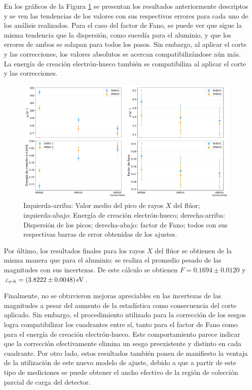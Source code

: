 En los gráficos de la Figura \ref{fig:F_mu_sigma_fano_eh} se presentan los resultados anteriormente descriptos y se ven las tendencias de los valores con sus respectivos errores para cada uno de los análisis realizados. Para el caso del factor de Fano, se puede ver que sigue la misma tendencia que la dispersión, como sucedía para el aluminio, y que los errores de ambos se solapan para todos los pasos. Sin embargo, al aplicar el corte y las correcciones, los valores absolutos se acercan compatibilizándose aún más. La energía de creación electrón-hueco también se compatibiliza al aplicar el corte y las correcciones.
\begin{figure}[h]
    \centering
        \includegraphics[scale=0.45]{Figs/F_mu_sigma_fano_Eeh.pdf}
    \caption{Izquierda-arriba: Valor medio del pico de rayos $X$ del flúor; izquierda-abajo: Energía de creación electrón-hueco; derecha-arriba: Dispersión de los picos; derecha-abajo: factor de Fano; todos con sus respectivas barras de error obtenidas de los ajustes.}
    \label{fig:F_mu_sigma_fano_eh}
\end{figure}

Por último, los resultados finales para los rayos $X$ del flúor se obtienen de la misma manera que para el aluminio:  se realiza el promedio pesado de las magnitudes con sus incertezas. De este cálculo se obtienen $F = 0.1694 \pm 0.0120 $ y $\varepsilon_{\eh} =(3.8222 \pm 0.0048)\,\si{eV}$.

Finalmente, no se obtuvieron mejoras apreciables en las incertezas de las magnitudes a pesar del aumento de la estadística como consecuencia del corte aplicado. Sin embargo, el procedimiento utilizado para la corrección de los sesgos logra compatibilizar los cuadrantes entre sí, tanto para el factor de Fano como para el energía de creación electrón-hueco. Este comportamiento parece indicar que la corrección efectivamente elimina un sesgo preexistente y distinto en cada cuadrante.
Por otro lado, estos resultados también ponen de manifiesto la ventaja de la utilización de este nuevo modelo de ajuste, debido a que a partir de este tipo de mediciones se puede obtener el ancho efectivo de la región de colección parcial de carga del detector.

